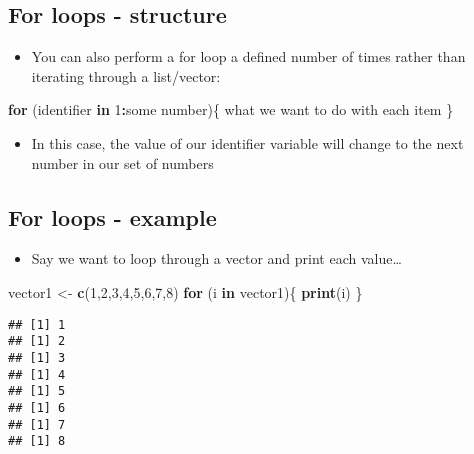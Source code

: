 \documentclass[]{article}
\newenvironment{Shaded}{\begin{snugshade}}{\end{snugshade}}
\newcommand{\KeywordTok}[1]{\textcolor[rgb]{0.13,0.29,0.53}{\textbf{#1}}}
\newcommand{\DecValTok}[1]{\textcolor[rgb]{0.00,0.00,0.81}{#1}}
\newcommand{\StringTok}[1]{\textcolor[rgb]{0.31,0.60,0.02}{#1}}
\newcommand{\ControlFlowTok}[1]{\textcolor[rgb]{0.13,0.29,0.53}{\textbf{#1}}}
\newcommand{\OperatorTok}[1]{\textcolor[rgb]{0.81,0.36,0.00}{\textbf{#1}}}
\newcommand{\NormalTok}[1]{#1}
\providecommand{\tightlist}{%
  \setlength{\itemsep}{0pt}\setlength{\parskip}{0pt}}
\begin{document}
\subsection{For loops - structure}\label{for-loops---structure}

\begin{itemize}
\tightlist
\item
  You can also perform a for loop a defined number of times rather than
  iterating through a list/vector:
\end{itemize}

\begin{Shaded}
\begin{Highlighting}[]
\ControlFlowTok{for}\NormalTok{ (identifier }\ControlFlowTok{in} \DecValTok{1}\OperatorTok{:}\NormalTok{some number)\{}
\NormalTok{  what we want to do with each item}
\NormalTok{\}}
\end{Highlighting}
\end{Shaded}

\begin{itemize}
\tightlist
\item
  In this case, the value of our identifier variable will change to the
  next number in our set of numbers
\end{itemize}

\subsection{For loops - example}\label{for-loops---example}

\begin{itemize}
\tightlist
\item
  Say we want to loop through a vector and print each value\ldots{}
\end{itemize}

\begin{Shaded}
\begin{Highlighting}[]
\NormalTok{vector1 <-}\StringTok{ }\KeywordTok{c}\NormalTok{(}\DecValTok{1}\NormalTok{,}\DecValTok{2}\NormalTok{,}\DecValTok{3}\NormalTok{,}\DecValTok{4}\NormalTok{,}\DecValTok{5}\NormalTok{,}\DecValTok{6}\NormalTok{,}\DecValTok{7}\NormalTok{,}\DecValTok{8}\NormalTok{)}
\ControlFlowTok{for}\NormalTok{ (i }\ControlFlowTok{in}\NormalTok{ vector1)\{}
  \KeywordTok{print}\NormalTok{(i)}
\NormalTok{\}}
\end{Highlighting}
\end{Shaded}

\begin{verbatim}
## [1] 1
## [1] 2
## [1] 3
## [1] 4
## [1] 5
## [1] 6
## [1] 7
## [1] 8
\end{verbatim}
\end{document}
